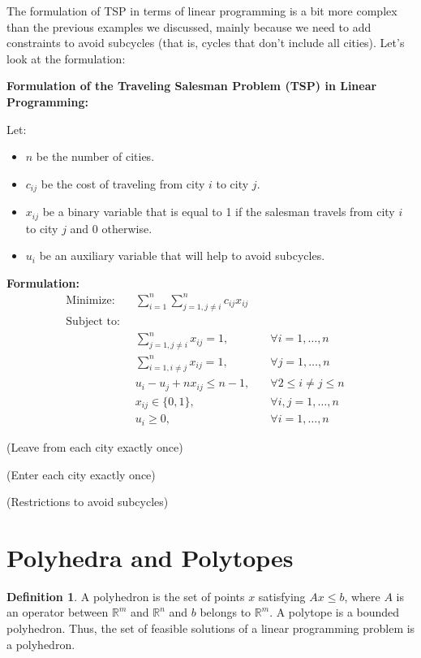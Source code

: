 \documentclass[]{article}
\theoremstyle{definition}
\newtheorem{definition}{Definition}[section]
\theoremstyle{definition}
\begin{document}
The formulation of TSP in terms of linear programming is a bit more complex than the previous examples we discussed, mainly because we need to add constraints to avoid subcycles (that is, cycles that don't include all cities). Let's look at the formulation:

\textbf{Formulation of the Traveling Salesman Problem (TSP) in Linear Programming:}


Let:
\begin{itemize}
	\item \( n \) be the number of cities.
	\item \( c_{ij} \) be the cost of traveling from city \( i \) to city \( j \).
	\item \( x_{ij} \) be a binary variable that is equal to 1 if the salesman travels from city \( i \) to city \( j \) and 0 otherwise.
	\item \( u_i \) be an auxiliary variable that will help to avoid subcycles.
\end{itemize}

\textbf{Formulation:}
\begin{align*}
\text{Minimize:} \quad & \sum_{i=1}^{n} \sum_{j=1, j \neq i}^{n} c_{ij} x_{ij} \\
\text{Subject to:} \\
& \sum_{j=1, j \neq i}^{n} x_{ij} = 1, \quad & \forall i = 1, \dots, n \quad\\
& \sum_{i=1, i \neq j}^{n} x_{ij} = 1, \quad & \forall j = 1, \dots, n \quad \\
& u_i - u_j + nx_{ij} \leq n-1, \quad & \forall 2 \leq i \neq j \leq n \quad \\
& x_{ij} \in \{0,1\}, \quad & \forall i,j = 1, \dots, n \\
& u_i \geq 0, \quad & \forall i = 1, \dots, n
\end{align*}

(Leave from each city exactly once)

(Enter each city exactly once)

(Restrictions to avoid subcycles)

\section{Polyhedra and Polytopes}

\begin{definition}
	A polyhedron is the set of points \( x \) satisfying \( Ax \leq b \), where \( A \) is an operator between \( \mathbb{R}^m \) and \( \mathbb{R}^n \) and \( b \) belongs to \( \mathbb{R}^m \). A polytope is a bounded polyhedron. Thus, the set of feasible solutions of a linear programming problem is a polyhedron.
\end{definition}
\end{document}
